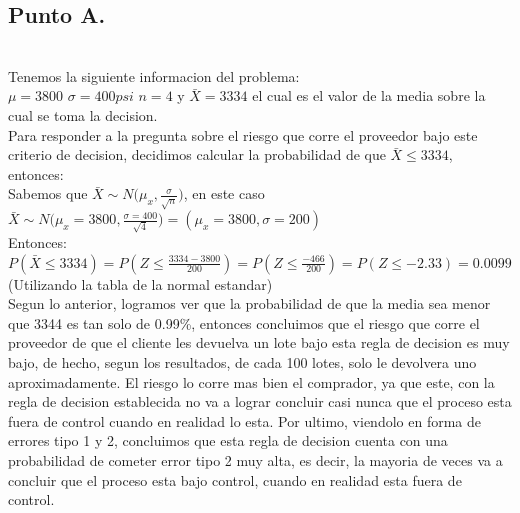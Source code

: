 \documentclass[letterpaper,12pt,onecolumn,titlepage]{article}
\begin{document}
\subsection{Punto A.}
~\\ Tenemos la siguiente informacion del problema:
~\\ $\mu=3800$  $\sigma=400psi$ $n=4$ y $\bar{X}=3334$ el cual es el valor de la media sobre la cual se toma la decision.
~\\ Para responder a la pregunta sobre el riesgo que corre el proveedor bajo este criterio de decision, decidimos calcular la probabilidad de que $\bar{X}\leq3334$, entonces:
~\\ Sabemos que $\bar{X}\sim{N(\mu_x,\frac{\sigma}{\sqrt{n}}})$, en este caso $\bar{X}\sim{N(\mu_x=3800,\frac{\sigma=400}{\sqrt{4}}})=(\mu_x=3800,\sigma=200)$
~\\Entonces:
~\\ $P(\bar{X}\leq3334)=P(Z\leq\frac{3334-3800}{200})=P(Z\leq\frac{-466}{200})=P(Z\leq-2.33)=0.0099$ (Utilizando la tabla de la normal estandar)
~\\Segun lo anterior, logramos ver que la probabilidad de que la media sea menor que 3344 es tan solo de 0.99\%, entonces concluimos que el riesgo que corre el proveedor de que el cliente les devuelva un lote bajo esta regla de decision es muy bajo, de hecho, segun los resultados, de cada 100 lotes, solo le devolvera uno aproximadamente. El riesgo lo corre mas bien el comprador, ya que este, con la regla de decision establecida no va a lograr concluir casi nunca que el proceso esta fuera de control cuando en realidad lo esta. Por ultimo, viendolo en forma de errores tipo 1 y 2, concluimos que esta regla de decision cuenta con una probabilidad de cometer error tipo 2 muy alta, es decir, la mayoria de veces va a concluir que el proceso esta bajo control, cuando en realidad esta fuera de control.
\end{document}
